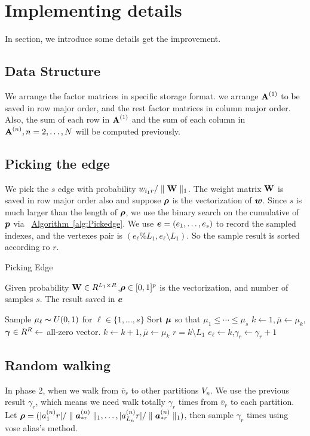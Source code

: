 \documentclass{article}
\newcommand{\V}[1]{{\bm{{\MakeLowercase{#1}}}}}%
\newcommand{\Vacol}[1]{\V{a}^{(#1)}_{*r}}
\newcommand{\M}[1]{{\bm{\mathbf{\MakeUppercase{#1}}}}}%
\newcommand{\Mn}[2]{\M{#1}^{(#2)}}%
\newcommand{\norm}[2]{\parallel#1\parallel_{#2}}
\newcommand{\Alg}[1]{\hyperref[alg:#1]{Algorithm~\ref*{alg:#1}}}
\begin{document}
\section{Implementing details}
In section, we introduce some details get the improvement.
\subsection{Data Structure}
We arrange the factor matrices in specific storage format. we arrange $\Mn{A}{1}$ to be saved in row major order, and the rest factor matrices in column major order. Also, the sum of each row in $\Mn{A}{1}$ and the sum of each column in $\Mn{A}{n},n=2,\ldots,N$ will be computed previously.

\subsection{Picking the edge}
We pick the $s$ edge with probability  $w_{i_1r}/\norm{\M{W}}{1}$. The weight matrix $\M{W}$ is saved in row major order also and suppose $\V{\rho}$ is the vectorization of $\V{W}$. Since $s$ is much larger than the length of $\V{\rho}$, we use the binary search on the cumulative of $\V{p}$ via ~\Alg{Pickedge}. We use $\V{e}=(e_1,\ldots,e_s)$ to record the sampled indexes, and the vertexes pair is $(e_{\ell}\%L_1,e_{\ell}\setminus L_1)$. So the sample result is sorted according ro $r$.


\begin{algorithm}[t]
    \caption{Picking Edge}
    \label{alg:Pickedge}
    Given probability $\M{W}\in R^{L_1\times R}$,$\V{\rho}\in[0,1]^p$ is the vectorization, and number of samples $s$.
    The result saved in $\V{e}$
    \begin{algorithmic}[1]
    \State Sample $\mu_{\ell} \thicksim U(0,1)$ for $\ell \in \{1,\ldots,s\}$
    \State Sort $\V{\mu}$ so that $\mu_1 \leq \cdots\leq\mu_s$
    \State $k \leftarrow 1,\overline{\mu} \leftarrow \mu_k$,$\V{\gamma}\in R^R\leftarrow$ all-zero vector.
    \While {$\mu_{\ell} > \overline{\mu}$}
    \State $k \leftarrow k+1,\overline{\mu} \leftarrow \mu_k$
    \EndWhile
    \State $r = k \setminus L_1$
    \State $e_{\ell}\leftarrow k$,$\gamma_{r}\leftarrow \gamma_{r} + 1$
    \EndFor
    \end{algorithmic}
\end{algorithm}
\subsection{Random walking}

In phase 2, when we walk from $\overline{v}_r$ to other partitions $V_n$. We use the previous result $\gamma_{r}$, which means we need walk totally $\gamma_{r}$ times from $\overline{v}_r$ to each  partition. Let $\V{\rho} = (|{a}^{(n)}_{1}{r}|/\norm{\Vacol{n}}{1},\ldots,|{a}^{(n)}_{L_n}{r}|/\norm{\Vacol{n}}{1})$, then sample $\gamma_{r}$ times using vose alias's method.
\end{document}
